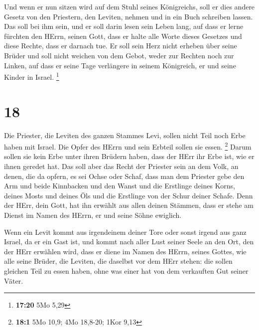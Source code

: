  Und wenn er nun sitzen wird auf dem Stuhl seines
Königreichs, soll er dies andere Gesetz von den Priestern, den Leviten,
nehmen und in ein Buch schreiben lassen.  Das soll bei ihm
sein, und er soll darin lesen sein Leben lang, auf dass er lerne
fürchten den HErrn, seinen Gott, dass er halte alle Worte dieses
Gesetzes und diese Rechte, dass er darnach tue.  Er soll
sein Herz nicht erheben über seine Brüder und soll nicht weichen von dem
Gebot, weder zur Rechten noch zur Linken, auf dass er seine Tage
verlängere in seinem Königreich, er und seine Kinder in Israel.
\footnote{\textbf{17:20} 5Mo 5,29}

\hypertarget{section-3}{%
\section{18}\label{section-3}}

 Die Priester, die Leviten des ganzen Stammes Levi, sollen
nicht Teil noch Erbe haben mit Israel. Die Opfer des HErrn und sein
Erbteil sollen sie essen. \footnote{\textbf{18:1} 5Mo 10,9; 4Mo 18,8-20;
  1Kor 9,13}  Darum sollen sie kein Erbe unter ihren Brüdern
haben, dass der HErr ihr Erbe ist, wie er ihnen geredet hat.
 Das soll aber das Recht der Priester sein an dem Volk, an
denen, die da opfern, es sei Ochse oder Schaf, dass man dem Priester
gebe den Arm und beide Kinnbacken und den Wanst  und die
Erstlinge deines Korns, deines Mosts und deines Öls und die Erstlinge
von der Schur deiner Schafe.  Denn der HErr, dein Gott, hat
ihn erwählt aus allen deinen Stämmen, dass er stehe am Dienst im Namen
des HErrn, er und seine Söhne ewiglich.

 Wenn ein Levit kommt aus irgendeinem deiner Tore oder sonst
irgend aus ganz Israel, da er ein Gast ist, und kommt nach aller Lust
seiner Seele an den Ort, den der HErr erwählen wird,  dass
er diene im Namen des HErrn, seines Gottes, wie alle seine Brüder, die
Leviten, die daselbst vor dem HErr stehen:  die sollen
gleichen Teil zu essen haben, ohne was einer hat von dem verkauften Gut
seiner Väter.

